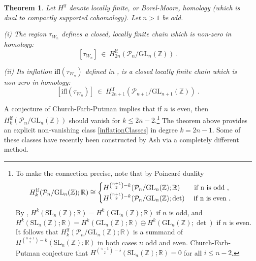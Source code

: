 \documentclass[10pt]{amsart}
\newcommand{\RR}{{\mathbb R}}
\newcommand{\ZZ}{{\mathbb Z}}
\theoremstyle{plain}
\newtheorem{thm}{Theorem}
\newcommand{\GL}{\mathrm{GL}}
\newcommand{\lf}{\mathrm{lf}}
\newcommand{\0}{\color{blue}{\mathsf{0}}}
\begin{document}
\begin{thm} \label{thm: introBMclass}
Let  $H^{\mathrm{lf}}$ denote  locally finite, or Borel-Moore, homology (which is dual to compactly supported cohomology).  Let $n>1$ be odd. 

(i) The region  $\tau_{W_n}$ defines a closed, locally finite  chain which is non-zero in homology:  
\begin{equation} \label{tauWinlf} [\tau_{W_n}]  \ \in \   H^{\mathrm{lf}}_{2n} \left( \mathcal{P}_{n}/\GL_{n}(\ZZ)\right) \ .  
\end{equation} 



(ii) Its inflation $\mathrm{ifl}(\tau_{W_n})$ defined in  \cite{TopWeightAg}, is  a closed locally finite chain which is non-zero in homology:
\begin{equation}  \label{inflationClasses} [\mathrm{ifl}(\tau_{W_n})]  \ \in \   H^{\mathrm{lf}}_{2n+1} \left( \mathcal{P}_{n+1}/\GL_{n+1}(\ZZ)\right) \ . \end{equation}
\end{thm}
A conjecture of Church-Farb-Putman \cite{ChurchFarbPutman} implies that if $n$ is even, then   $H^{\mathrm{lf}}_{k} \left( \mathcal{P}_{n}/\GL_{n}(\ZZ)\right)$ should vanish for $k\leq  2n-2 .$\footnote{To make the connection precise, note that by Poincar\'e duality
\[H^{\lf}_k( \mathcal{P}_n/\GL_n(\ZZ);\RR) \cong \begin{cases}  H^{\binom{n+1}{2}-k}(\mathcal{P}_n/\GL_n(\ZZ);\RR) \quad\;\;\, \hbox{ if  n is odd\ ,} \\ 
  H^{\binom{n+1}{2}-k}(\mathcal{P}_n/\GL_n(\ZZ);\det) \quad \hbox{ if  n is even\ .}
\end{cases} \] 
By        \cite[\S7.2]{ElbazVincentGanglSoule}, 
$H^k(\mathrm{SL}_n(\ZZ);\RR) = H^k(\GL_n(\ZZ);\RR) $ if $n$ is odd, and  $H^k(\mathrm{SL}_n(\ZZ);\RR) = H^k(\GL_n(\ZZ);\RR) \oplus H^k(\GL_n(\ZZ);\det)$ if $n$ is even. It follows that $H^{\lf}_k( \mathcal{P}_n/\GL_n(\ZZ);\RR)$ is a summand of 
$H^{\binom{n+1}{2}-k}(\mathrm{SL}_n(\ZZ);\RR) $ in both cases $n$ odd and even. 
Church-Farb-Putman conjecture that $H^{\binom{n-1}{2}-i}(\mathrm{SL}_n(\ZZ);\RR)=0$ for all $i \leq n-2$.} The theorem above provides  an  explicit non-vanishing class \eqref{inflationClasses} in degree $k=2n-1$.  Some of these classes have recently been constructed by Ash \cite{AshSharblies}
via a completely different method. 
\end{document}
